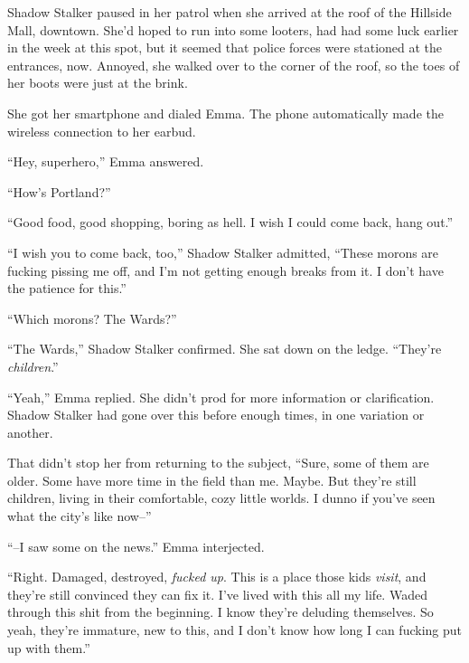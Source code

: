 





Shadow Stalker paused in her patrol when she arrived at the roof of the Hillside Mall, downtown.  She'd hoped to run into some looters, had had some luck earlier in the week at this spot, but it seemed that police forces were stationed at the entrances, now.  Annoyed, she walked over to the corner of the roof, so the toes of her boots were just at the brink.



She got her smartphone and dialed Emma.  The phone automatically made the wireless connection to her earbud.



``Hey, superhero,'' Emma answered.



``How's Portland?''



``Good food, good shopping, boring as hell.  I wish I could come back, hang out.''



``I wish you to come back, too,'' Shadow Stalker admitted, ``These morons are fucking pissing me off, and I'm not getting enough breaks from it.  I don't have the patience for this.''



``Which morons?  The Wards?''



``The Wards,'' Shadow Stalker confirmed.  She sat down on the ledge.  ``They're \emph{children}.''



``Yeah,'' Emma replied.  She didn't prod for more information or clarification.  Shadow Stalker had gone over this before enough times, in one variation or another.



That didn't stop her from returning to the subject, ``Sure, some of them are older.  Some have more time in the field than me.  Maybe.  But they're still children, living in their comfortable, cozy little worlds.  I dunno if you've seen what the city's like now--''



``--I saw some on the news.'' Emma interjected.



``Right.  Damaged, destroyed, \emph{fucked up}.  This is a place those kids \emph{visit}, and they're still convinced they can fix it.  I've lived with this all my life.  Waded through this shit from the beginning.  I know they're deluding themselves.  So yeah, they're immature, new to this, and I don't know how long I can fucking put up with them.''



